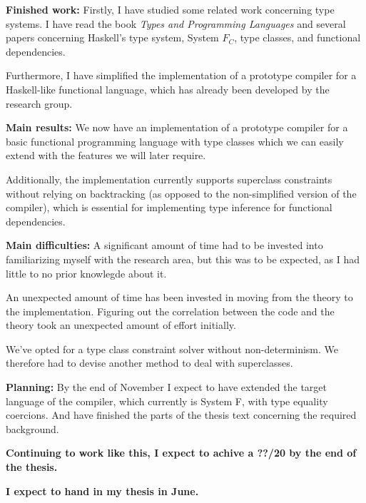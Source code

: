\documentclass[12pt]{report}
\begin{document}
\vspace{1cm}
{\bf Finished work:}
Firstly, I have studied some related work concerning type systems. I have read
the book \textit{Types and Programming Languages} and several papers concerning
Haskell's type system, System $F_C$, type classes, and functional dependencies.

Furthermore, I have simplified the implementation of a prototype compiler for a
Haskell-like functional language, which has already been developed by the
research group.


\vspace{1cm}
{\bf Main results:}
We now have an implementation of a prototype compiler for a basic functional
programming language with type classes which we can easily extend with the
features we will later require.

Additionally, the implementation currently supports superclass constraints
without relying on backtracking (as opposed to the non-simplified version of
the compiler), which is essential for implementing type inference for
functional dependencies.

\vspace{1cm}
{\bf Main difficulties:}
A significant amount of time had to be invested into familiarizing myself with
the research area, but this was to be expected, as I had little to no prior
knowlegde about it.

An unexpected amount of time has been invested in moving from the theory to the
implementation. Figuring out the correlation between the code and the theory
took an unexpected amount of effort initially.

We've opted for a type class constraint solver without non-determinism. We
therefore had to devise another method to deal with superclasses.

\vspace{1cm}
{\bf Planning:}
By the end of November I expect to have extended the target language of the
compiler, which currently is System F,  with type equality coercions. And have
finished the parts of the thesis text concerning the required background.

\vspace{1cm}
{\bf Continuing to work like this, I expect to achive a ??/20 by the end of the
thesis.}

{\bf I expect to hand in my thesis in June.}
\end{document}
